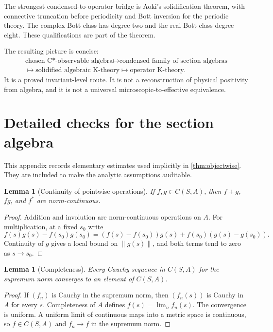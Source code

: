 \documentclass[12pt]{article}
\newtheorem{lemma}[theorem]{Lemma}
\theoremstyle{definition}
\theoremstyle{remark}
\begin{document}
The strongest condensed-to-operator bridge is Aoki's solidification theorem, with
connective truncation before periodicity and Bott inversion for the periodic theory.
The complex Bott class has degree two and the real Bott class degree eight.  These
qualifications are part of the theorem.

The resulting picture is concise:
\[
\begin{gathered}
\text{chosen C*-observable algebra}
\longmapsto
\text{condensed family of section algebras}
\\
\longmapsto
\text{solidified algebraic K-theory}
\longmapsto
\text{operator K-theory}.
\end{gathered}
\]
It is a proved invariant-level route.  It is not a reconstruction of physical
positivity from algebra, and it is not a universal microscopic-to-effective
equivalence.

\appendix

\section{Detailed checks for the section algebra}

This appendix records elementary estimates used implicitly in
\cref{thm:objectwise}.  They are included to make the analytic assumptions auditable.

\begin{lemma}[Continuity of pointwise operations]
If $f,g\in C(S,A)$, then $f+g$, $fg$, and $f^*$ are norm-continuous.
\end{lemma}

\begin{proof}
Addition and involution are norm-continuous operations on $A$.  For multiplication,
at a fixed $s_0$ write
\[
f(s)g(s)-f(s_0)g(s_0)
=
(f(s)-f(s_0))g(s)+f(s_0)(g(s)-g(s_0)).
\]
Continuity of $g$ gives a local bound on $\|g(s)\|$, and both terms tend to zero as
$s\to s_0$.
\end{proof}

\begin{lemma}[Completeness]
Every Cauchy sequence in $C(S,A)$ for the supremum norm converges to an element of
$C(S,A)$.
\end{lemma}

\begin{proof}
If $(f_n)$ is Cauchy in the supremum norm, then $(f_n(s))$ is Cauchy in $A$ for every
$s$.  Completeness of $A$ defines $f(s)=\lim_nf_n(s)$.  The convergence is uniform.
A uniform limit of continuous maps into a metric space is continuous, so
$f\in C(S,A)$ and $f_n\to f$ in the supremum norm.
\end{proof}
\end{document}
